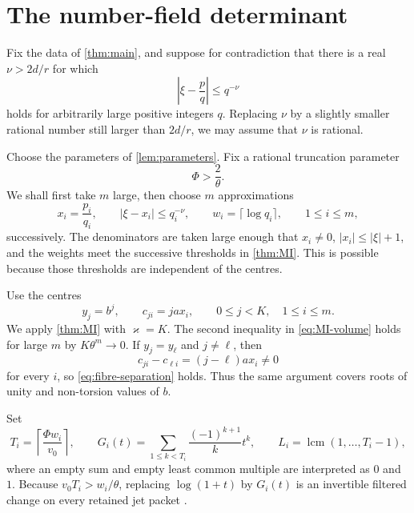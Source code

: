 \documentclass[11pt]{article}
\DeclareMathOperator{\lcm}{lcm}
\theoremstyle{definition}
\theoremstyle{remark}
\numberwithin{equation}{section}
\begin{document}
\section{The number-field determinant}\label{sec:determinant}

Fix the data of \cref{thm:main}, and suppose for contradiction that
there is a real $\nu>2d/r$ for which
\begin{equation}\label{eq:good-approximations}
 \left|\xi-\frac pq\right|\le q^{-\nu}
\end{equation}
holds for arbitrarily large positive integers $q$.  Replacing $\nu$ by
a slightly smaller rational number still larger than $2d/r$, we may
assume that $\nu$ is rational.

Choose the parameters of \cref{lem:parameters}.  Fix a rational
truncation parameter
\begin{equation}\label{eq:Phi}
 \Phi>\frac2\theta.
\end{equation}
We shall first take $m$ large, then choose $m$ approximations
\[
 x_i=\frac{p_i}{q_i},\qquad
 \left|\xi-x_i\right|\le q_i^{-\nu},
 \qquad w_i=\lceil\log q_i\rceil,
 \qquad 1\le i\le m,
\]
successively.  The denominators are taken large enough that $x_i\ne0$,
$|x_i|\le|\xi|+1$, and the weights meet the successive thresholds in
\cref{thm:MI}.  This is possible because those thresholds are
independent of the centres.

Use the centres
\begin{equation}\label{eq:centres}
 y_j=b^j,\qquad c_{ji}=ja x_i,
 \qquad 0\le j<K,\quad1\le i\le m.
\end{equation}
We apply \cref{thm:MI} with $\varkappa=K$.  The second inequality in
\eqref{eq:MI-volume} holds for large $m$ by $K\theta^m\to0$.  If
$y_j=y_\ell$ and $j\ne\ell$, then
\[
 c_{ji}-c_{\ell i}=(j-\ell)a x_i\ne0
\]
for every $i$, so \eqref{eq:fibre-separation} holds.  Thus the same
argument covers roots of unity and non-torsion values of $b$.

Set
\begin{equation}\label{eq:truncations}
 T_i=\left\lceil\frac{\Phi w_i}{v_0}\right\rceil,
 \qquad
 G_i(t)=\sum_{1\le k<T_i}\frac{(-1)^{k+1}}{k}t^k,
 \qquad
 L_i=\lcm(1,\ldots,T_i-1),
\end{equation}
where an empty sum and empty least common multiple are interpreted as
$0$ and $1$.  Because $v_0T_i>w_i/\theta$, replacing $\log(1+t)$ by
$G_i(t)$ is an invertible filtered change on every retained jet packet
\cite[Section~4]{LiuJiangZhang2026}.
\end{document}

